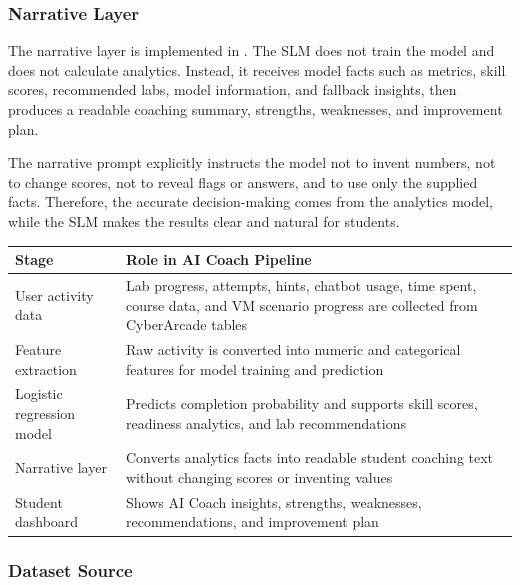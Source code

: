 \documentclass[12pt,a4paper]{report}
\newcommand{\hrow}{}
\newcommand{\hcell}[1]{\textbf{#1}}
\newcommand{\altrow}{}
\begin{document}
\subsubsection{Narrative Layer}

The narrative layer is implemented in . The SLM does not train the model and does not calculate analytics. Instead, it receives model facts such as metrics, skill scores, recommended labs, model information, and fallback insights, then produces a readable coaching summary, strengths, weaknesses, and improvement plan.

The narrative prompt explicitly instructs the model not to invent numbers, not to change scores, not to reveal flags or answers, and to use only the supplied facts. Therefore, the accurate decision-making comes from the analytics model, while the SLM makes the results clear and natural for students.

\begin{center}
\begin{tabular}{|L{4.2cm}|L{9.3cm}|}
\hline
\hrow \hcell{Stage} & \hcell{Role in AI Coach Pipeline} \\
\hline
User activity data & Lab progress, attempts, hints, chatbot usage, time spent, course data, and VM scenario progress are collected from CyberArcade tables \\
\hline
\altrow Feature extraction & Raw activity is converted into numeric and categorical features for model training and prediction \\
\hline
Logistic regression model & Predicts completion probability and supports skill scores, readiness analytics, and lab recommendations \\
\hline
\altrow Narrative layer & Converts analytics facts into readable student coaching text without changing scores or inventing values \\
\hline
Student dashboard & Shows AI Coach insights, strengths, weaknesses, recommendations, and improvement plan \\
\hline
\end{tabular}
\label{tab:ai-coach-pipeline}
\end{center}

\subsubsection{Dataset Source}
\end{document}
